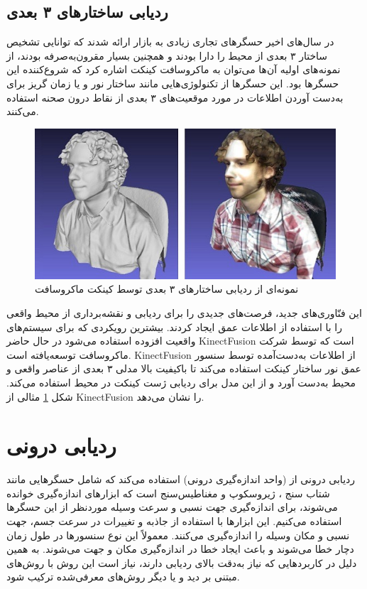 \subsection{ردیابی ساختارهای ۳ بعدی\protect{}}
در سال‌های اخیر حسگرهای تجاری زیادی به بازار ارائه شدند که توانایی تشخیص ساختار ۳ بعدی از محیط را دارا بودند و همچنین بسیار مقرون‌به‌صرفه بودند، از نمونه‌های اولیه آن‌ها می‌توان به ماکروسافت کینکت اشاره کرد که شروع‌کننده این حسگرها بود\cite{zhang2012microsoft}. این حسگرها از تکنولوژی‌هایی مانند ساختار نور\cite{scharstein2003high} و یا زمان گریز \cite{gokturk2004time}برای به‌دست آوردن اطلاعات در مورد موقعیت‌های ۳ بعدی از نقاط درون صحنه استفاده می‌کنند.
\begin{figure}
	\centering
	\includegraphics[width=1\linewidth]{image/kinect}
	\caption {نمونه‌ای از ردیابی ساختارهای ۳ بعدی توسط کینکت ماکروسافت    \cite{izadi2011kinectfusion}}
	\label{fig:kinect}
\end{figure}

 این فنّاوری‌های جدید، فرصت‌های جدیدی را برای ردیابی و نقشه‌برداری از محیط واقعی را با استفاده از اطلاعات عمق ایجاد کردند. بیشترین رویکردی که برای سیستم‌های واقعیت افزوده استفاده می‌شود در حال حاضر KinectFusion است که توسط شرکت ماکروسافت توسعه‌یافته است. KinectFusion از اطلاعات به‌دست‌آمده توسط سنسور عمق نور ساختار کینکت استفاده می‌کند تا باکیفیت بالا مدلی ۳ بعدی از عناصر واقعی و محیط به‌دست آورد و از این مدل برای ردیابی ژست کینکت در محیط استفاده می‌کند. شکل \ref{fig:kinect} مثالی از KinectFusion را نشان می‌دهد\cite{izadi2011kinectfusion}.

\section{ردیابی درونی\protect{}}

ردیابی درونی از (واحد اندازه‌گیری درونی) استفاده می‌کند که شامل حسگرهایی مانند شتاب سنج ، ژیروسکوپ  و مغناطیس‌سنج  است که ابزارهای اندازه‌گیری خوانده می‌شوند، برای اندازه‌گیری جهت نسبی و سرعت وسیله موردنظر از این حسگرها استفاده می‌کنیم. این ابزارها با استفاده از جاذبه و تغییرات در سرعت جسم، جهت نسبی و مکان وسیله را اندازه‌گیری می‌کنند. معمولاً این نوع سنسورها در طول زمان دچار خطا می‌شوند و باعث ایجاد خطا در اندازه‌گیری مکان و جهت می‌شوند. به همین دلیل در کاربردهایی که نیاز به‌دقت بالای ردیابی دارند، نیاز است این روش با روش‌های مبتنی بر دید و یا دیگر روش‌های معرفی‌شده ترکیب شود\cite{Billinghurst}.
